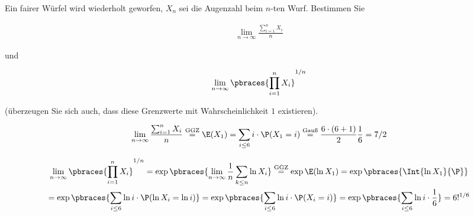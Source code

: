 
\begin{exercise}

Ein fairer Würfel wird wiederholt geworfen, $X_n$ sei die Augenzahl beim $n$-ten Wurf.
Bestimmen Sie

\begin{align*}
    \lim_{n \to \infty}
        \frac{\sum_{i=1}^n X_i}{n}
\end{align*}

und

\begin{align*}
    \lim_{n \to \infty}
        \pbraces{\prod_{i=1}^n X_i}^{1/n}
\end{align*}

(überzeugen Sie sich auch, dass diese Grenzwerte mit Wahrscheinlichkeit $1$ existieren).

\end{exercise}


\begin{solution}

\phantom{}


\begin{align*}
    \lim_{n \to \infty}
        \frac{\sum_{i=1}^n X_i}{n}
    \stackrel
    {
        \text{GGZ}
    }{=}
    \E(X_1)
    =
    \sum_{i \leq 6}
        i \cdot \P(X_1 = i)
    \stackrel
    {
        \text{Gauß}
    }{=}
    \frac{6 \cdot (6 + 1)}{2} \frac{1}{6}
    =
    7/2
\end{align*}

\begin{multline*}
    \lim_{n \to \infty}
        \pbraces{\prod_{i=1}^n X_i}^{1/n}
    =
    \exp \pbraces{\lim_{n \to \infty} \frac{1}{n} \sum_{k \leq n} \ln X_i}
    \stackrel
    {
        \text{GGZ}
    }{=}
    \exp \E(\ln X_1)
    =
    \exp \pbraces{\Int{\ln X_1}{\P}} \\
    =
    \exp \pbraces{\sum_{i \leq 6} \ln i \cdot \P(\ln X_i = \ln i)}
    =
    \exp \pbraces{\sum_{i \leq 6} \ln i \cdot \P(X_i = i)}
    =
    \exp \pbraces{\sum_{i \leq 6} \ln i \cdot \frac{1}{6}}
    =
    6!^{1/6}
\end{multline*}

\end{solution}

